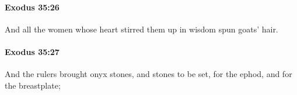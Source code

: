 		\paragraph{Exodus 35:26} %
			\label{EXODUS-35-26}

			And all the women whose heart stirred them up in wisdom spun goats' hair.


		\paragraph{Exodus 35:27} %
			\label{EXODUS-35-27}

			And the rulers brought onyx stones, and stones to be set, for the ephod, and for the breastplate;


